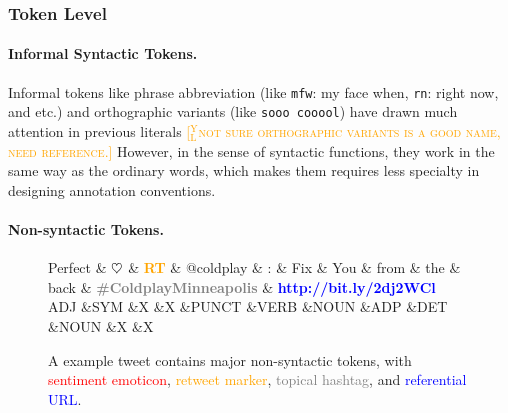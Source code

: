 \documentclass[11pt,letterpaper]{article}
\newcommand{\heart}{\ensuremath\heartsuit}
\newcommand{\yjcomment}[1]{\textcolor{orange}{[$_\mathrm{L}^\mathrm{Y}$\textsc{#1}]}}
\begin{document}
\subsubsection{Token Level}
\paragraph{Informal Syntactic Tokens.}
Informal tokens like phrase abbreviation (like {\tt mfw}: my face when, {\tt rn}: right now, and etc.) and orthographic variants (like {\tt sooo cooool}) have drawn much attention in previous literals \cite{finin-EtAl:2010:MTURK,eisenstein:2013:NAACL-HLT} \yjcomment{not sure orthographic variants is a good name, need reference.}
However, in the sense of syntactic functions, they work in the same way as the ordinary words, which makes them requires less specialty in designing annotation conventions.

\paragraph{Non-syntactic Tokens.}

\begin{figure*}[t]
	\centering
	\small
	\begin{dependency}[edge slant=2, text only label, label style=above]
		\begin{deptext}
			Perfect \& \textcolor{red}{\bf $\heart$} \& \textcolor{orange}{\bf RT} \& @coldplay \& : \& Fix \& You \& from \& the \& back \& \textcolor{gray}{\bf \#ColdplayMinneapolis} \& \textcolor{blue}{\bf http://bit.ly/2dj2WCl}\\
			\tiny ADJ \&\tiny SYM \&\tiny X \&\tiny X \&\tiny PUNCT \&\tiny VERB \&\tiny NOUN \&\tiny ADP \&\tiny DET \&\tiny NOUN \&\tiny X \&\tiny X \\
		\end{deptext}
	\end{dependency}
	\caption{A example tweet contains major non-syntactic tokens, with
		\textcolor{red}{sentiment emoticon},
		\textcolor{orange}{retweet marker},
		\textcolor{gray}{topical hashtag}, and
		\textcolor{blue}{referential URL}.}\label{fig:non-syn-toks}
\end{figure*}
\end{document}
